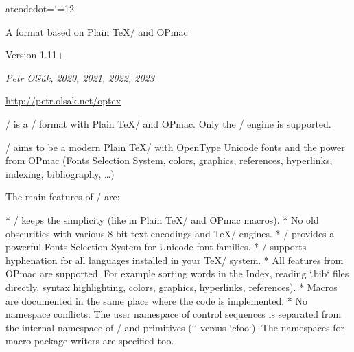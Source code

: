 

  \let\enddocument=\endinput
\let\_catcodedot=\relax \catcode`\.=12 %

\typosize[10/12]  %

\begingroup \typosize [11/13.5] %



\centerline{\rm\OpTeX}
\vskip-8mm

\tit A format based on Plain \TeX/ and OPmac

\hfill Version 1.11+

\centerline{\it Petr Olšák, 2020, 2021, 2022, 2023}

\bigskip
\centerline{\url{http://petr.olsak.net/optex}}


\bigskip
\noindent
\OpTeX/ is a \LuaTeX/ format with Plain \TeX/ and OPmac. Only the \LuaTeX/ engine
is supported. 

\OpTeX/ aims to be a modern Plain \TeX/
with OpenType Unicode fonts and the power from OPmac
(Fonts Selection System, colors, graphics, references, hyperlinks,
indexing, bibliography, \dots)

The main features of \OpTeX/ are:

\begitems
* \OpTeX/ keeps the simplicity (like in Plain \TeX/ and OPmac macros).
* No old obscurities with various 8-bit text encodings and \TeX/ engines.
* \OpTeX/ provides a powerful Fonts Selection System for Unicode font
  families.
* \OpTeX/ supports hyphenation for all languages installed in your \TeX/ system.
* All features from OPmac are supported. For example sorting words in
  the Index, reading `.bib` files directly, syntax 
  highlighting, colors, graphics, hyperlinks, references).
* Macros are documented in the same place where the code is implemented.
* No namespace conflicts: The user namespace of control sequences is separated from the internal namespace
  of \OpTeX/ and primitives (`\foo` versus `\_foo`). The namespaces for  macro package writers are specified too.
\enditems

